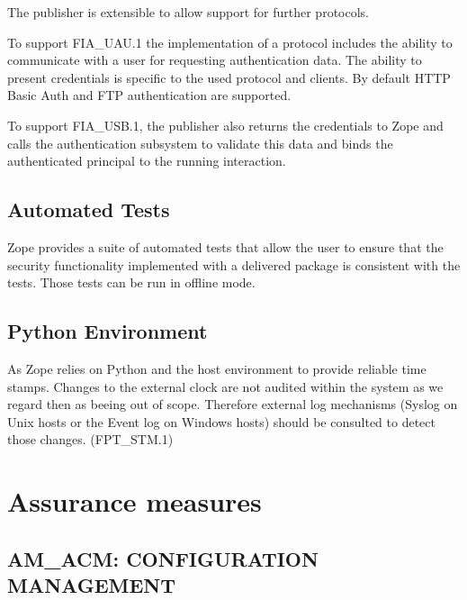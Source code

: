 \documentclass[12pt,english]{scrbook}
\begin{document}
The publisher is extensible to allow support for further protocols.

To support FIA{\_}UAU.1 the implementation of a protocol includes the ability to
communicate with a user for requesting authentication data. The ability to
present credentials is specific to the used protocol and clients. By default
HTTP Basic Auth and FTP authentication are supported.

To support FIA{\_}USB.1, the publisher also returns the credentials to Zope and
calls the authentication subsystem to validate this data and binds the
authenticated principal to the running interaction.



\subsection{Automated Tests}

Zope provides a suite of automated tests that allow the user to ensure that the
security functionality implemented with a delivered package is consistent with
the tests. Those tests can be run in offline mode.





\subsection{Python Environment}

As Zope relies on Python and the host environment to provide reliable time
stamps. Changes to the external clock are not audited within the system as we
regard then as beeing out of scope.  Therefore external log mechanisms (Syslog
on Unix hosts or the Event log on Windows hosts) should be consulted to detect
those changes. (FPT{\_}STM.1)



\section{Assurance measures}





\subsection{AM{\_}ACM: CONFIGURATION MANAGEMENT}
\end{document}
